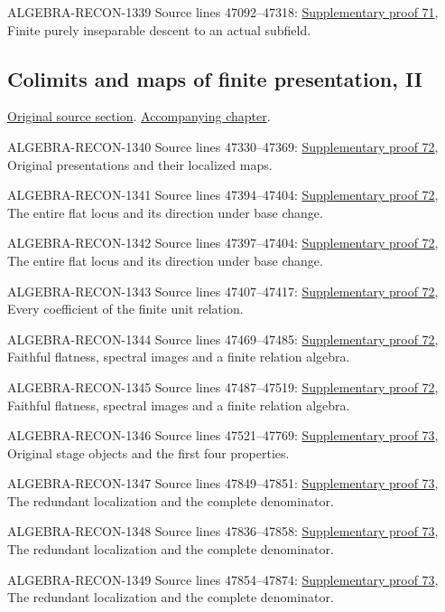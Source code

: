 \begin{AlgebraSourceRoutes}
\item[ALGEBRA-RECON-1339] Source lines 47092--47318: \hyperlink{algebra_georeg_cm_notes_20260929}{Supplementary proof 71}, Finite purely inseparable descent to an actual subfield.
\end{AlgebraSourceRoutes}

\subsection{Colimits and maps of finite presentation, II}
\hypertarget{algebra-source-section-colimits-finite-presentation}{}
\noindent\href{https://github.com/stacks/stacks-project/blob/a04446e57ec1fbc252a871afcec7752fb2807b14/algebra.tex\#L47319}{Original source section}. \href{algebra.pdf\#nameddest=section-colimits-finite-presentation}{Accompanying chapter}.

\begin{AlgebraSourceRoutes}
\item[ALGEBRA-RECON-1340] Source lines 47330--47369: \hyperlink{algebra_fp_flat_notes_20260929}{Supplementary proof 72}, Original presentations and their localized maps.
\item[ALGEBRA-RECON-1341] Source lines 47394--47404: \hyperlink{algebra_fp_flat_notes_20260929}{Supplementary proof 72}, The entire flat locus and its direction under base change.
\item[ALGEBRA-RECON-1342] Source lines 47397--47404: \hyperlink{algebra_fp_flat_notes_20260929}{Supplementary proof 72}, The entire flat locus and its direction under base change.
\item[ALGEBRA-RECON-1343] Source lines 47407--47417: \hyperlink{algebra_fp_flat_notes_20260929}{Supplementary proof 72}, Every coefficient of the finite unit relation.
\item[ALGEBRA-RECON-1344] Source lines 47469--47485: \hyperlink{algebra_fp_flat_notes_20260929}{Supplementary proof 72}, Faithful flatness, spectral images and a finite relation algebra.
\item[ALGEBRA-RECON-1345] Source lines 47487--47519: \hyperlink{algebra_fp_flat_notes_20260929}{Supplementary proof 72}, Faithful flatness, spectral images and a finite relation algebra.
\item[ALGEBRA-RECON-1346] Source lines 47521--47769: \hyperlink{algebra_fp_end_notes_20260929}{Supplementary proof 73}, Original stage objects and the first four properties.
\item[ALGEBRA-RECON-1347] Source lines 47849--47851: \hyperlink{algebra_fp_end_notes_20260929}{Supplementary proof 73}, The redundant localization and the complete denominator.
\item[ALGEBRA-RECON-1348] Source lines 47836--47858: \hyperlink{algebra_fp_end_notes_20260929}{Supplementary proof 73}, The redundant localization and the complete denominator.
\item[ALGEBRA-RECON-1349] Source lines 47854--47874: \hyperlink{algebra_fp_end_notes_20260929}{Supplementary proof 73}, The redundant localization and the complete denominator.
\end{AlgebraSourceRoutes}

